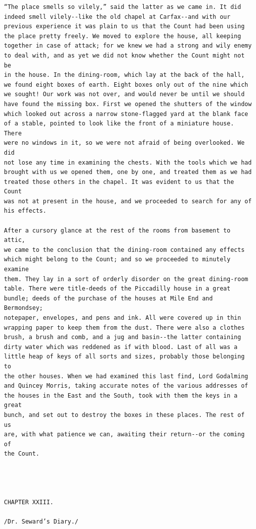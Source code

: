\documentclass{article}
\begin{document}
\begin{verbatim}
“The place smells so vilely,” said the latter as we came in. It did
indeed smell vilely--like the old chapel at Carfax--and with our
previous experience it was plain to us that the Count had been using
the place pretty freely. We moved to explore the house, all keeping
together in case of attack; for we knew we had a strong and wily enemy
to deal with, and as yet we did not know whether the Count might not be
in the house. In the dining-room, which lay at the back of the hall,
we found eight boxes of earth. Eight boxes only out of the nine which
we sought! Our work was not over, and would never be until we should
have found the missing box. First we opened the shutters of the window
which looked out across a narrow stone-flagged yard at the blank face
of a stable, pointed to look like the front of a miniature house. There
were no windows in it, so we were not afraid of being overlooked. We did
not lose any time in examining the chests. With the tools which we had
brought with us we opened them, one by one, and treated them as we had
treated those others in the chapel. It was evident to us that the Count
was not at present in the house, and we proceeded to search for any of
his effects.

After a cursory glance at the rest of the rooms from basement to attic,
we came to the conclusion that the dining-room contained any effects
which might belong to the Count; and so we proceeded to minutely examine
them. They lay in a sort of orderly disorder on the great dining-room
table. There were title-deeds of the Piccadilly house in a great
bundle; deeds of the purchase of the houses at Mile End and Bermondsey;
notepaper, envelopes, and pens and ink. All were covered up in thin
wrapping paper to keep them from the dust. There were also a clothes
brush, a brush and comb, and a jug and basin--the latter containing
dirty water which was reddened as if with blood. Last of all was a
little heap of keys of all sorts and sizes, probably those belonging to
the other houses. When we had examined this last find, Lord Godalming
and Quincey Morris, taking accurate notes of the various addresses of
the houses in the East and the South, took with them the keys in a great
bunch, and set out to destroy the boxes in these places. The rest of us
are, with what patience we can, awaiting their return--or the coming of
the Count.




CHAPTER XXIII.

/Dr. Seward’s Diary./



\end{verbatim}
\end{document}
